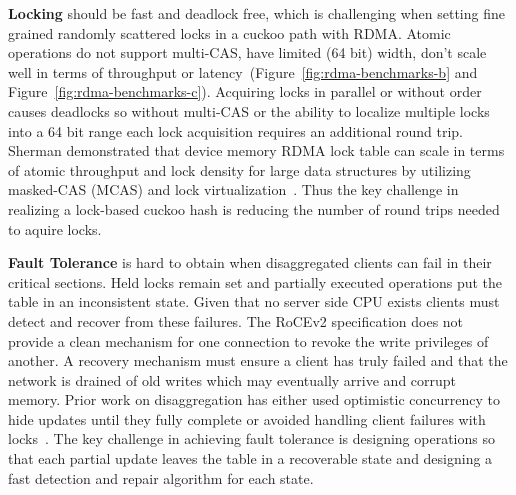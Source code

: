 \textbf{Locking} should be fast and deadlock free, which is
challenging when setting fine grained randomly scattered
locks in a cuckoo path with RDMA. Atomic operations do not
support multi-CAS, have limited (64 bit) width, don't scale
well in terms of throughput or
latency~\cite{design-guidelines}(Figure~\ref{fig:rdma-benchmarks-b} and Figure~\ref{fig:rdma-benchmarks-c}). Acquiring locks in parallel or without order causes
deadlocks so without multi-CAS or the ability to localize
multiple locks into a 64 bit range each lock acquisition
requires an additional round trip.
Sherman demonstrated that device memory RDMA lock table can
scale in terms of atomic throughput and lock density for
large data structures by utilizing masked-CAS (MCAS) and
lock virtualization~\cite{sherman}. Thus the key challenge
in realizing a lock-based cuckoo hash is reducing the number
of round trips needed to aquire locks.


\textbf{Fault Tolerance} is hard to obtain when
disaggregated clients can fail in their critical sections.
Held locks remain set and partially executed operations put
the table in an inconsistent state. Given that no server
side CPU exists clients must detect and recover from these
failures. The RoCEv2 specification does not provide a clean
mechanism for one connection to revoke the write privileges
of another. A recovery mechanism must ensure a client has
truly failed and that the network is drained of old writes
which may eventually arrive and corrupt memory.
Prior work on disaggregation has either used optimistic
concurrency to hide updates until they fully complete or
avoided handling client failures with locks~\cite{sherman}.
The key challenge in achieving fault tolerance is designing
operations so that each partial update leaves the table in a
recoverable state and designing a fast detection and repair
algorithm for each state.

